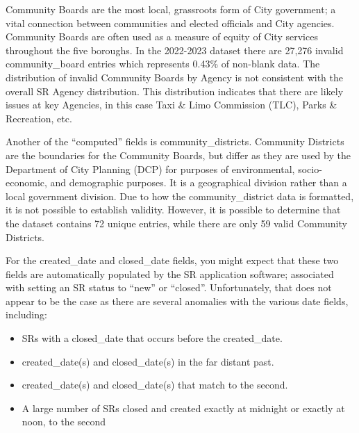\documentclass[12pt, titlepage]{article}
\begin{document}
\label{sec:communityboards}
Community Boards are the most local, grassroots form of 
City government; a vital connection between communities and 
elected officials and City agencies. Community Boards are often
used as a measure of equity of City services throughout the five 
boroughs. In the 2022-2023 dataset there are 27,276 invalid community\_board 
entries which represents 0.43\% of non-blank data. The distribution 
of invalid Community Boards by Agency is not consistent with 
the overall SR Agency distribution. This distribution indicates that 
there are likely issues at key Agencies, in this case Taxi \& Limo 
Commission (TLC), Parks \& Recreation, etc. 

\label{sec:communitydistrict}
Another of the ``computed'' fields is community\_districts. Community Districts 
are the boundaries for the Community Boards, but differ as they
are used by the Department of City Planning (DCP) for purposes 
of environmental, socio-economic, and demographic 
purposes. It is a geographical division rather than a local 
government division. Due to how the community\_district data 
is formatted, it is not possible to establish validity. However, 
it is possible to determine that the dataset contains 72 unique 
entries, while there are only 59 valid Community Districts. 
	
\label{sec:negativeduration}
For the created\_date and closed\_date fields, you might 
expect that these two fields are automatically populated by the 
SR application software; associated with setting an SR status 
to ``new'' or ``closed''. Unfortunately, that does not appear 
to be the case as there are several anomalies with the various date 
fields, including:
	
	
\begin{itemize}
	\item SRs with a closed\_date that occurs before the created\_date.

 	\item created\_date(s) and closed\_date(s) in the far distant past.

 	\item created\_date(s) and closed\_date(s) that match to the second.

	\item A large number of SRs closed and created exactly at midnight 
	or exactly at noon, to the second
\end{itemize}
	
\end{document}
